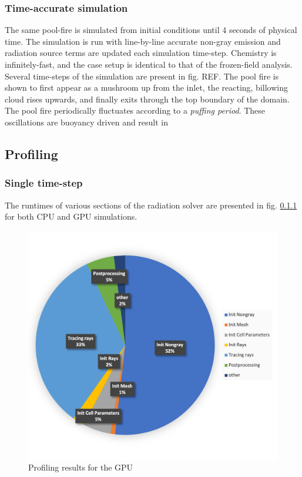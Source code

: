\subsubsection{Time-accurate simulation}
The same pool-fire is simulated from initial conditions until 4 seconds of physical time.
The simulation is run with line-by-line accurate non-gray emission and radiation source terms are updated each simulation time-step. Chemistry is infinitely-fast, and the case setup is identical to that of the frozen-field analysis.
Several time-steps of the simulation are present in fig. REF. The pool fire is shown to first appear as a mushroom up from the inlet, the reacting, billowing cloud rises upwards, and finally exits through the top boundary of the domain.
The pool fire periodically fluctuates according to a \textit{puffing period}. These oscillations are buoyancy driven and result in 


\subsection{Profiling}
\subsubsection{Single time-step}
The runtimes of various sections of the radiation solver are presented in fig. \ref{} for both CPU and GPU simulations.

\begin{figure}
\includegraphics[width=\linewidth]{figures/ch4/PoolFire_profiling_OnetimestepGPU.png}
\caption{Profiling results for the GPU}
\label{fig:PoolFire_quadcomparison}
\end{figure}

